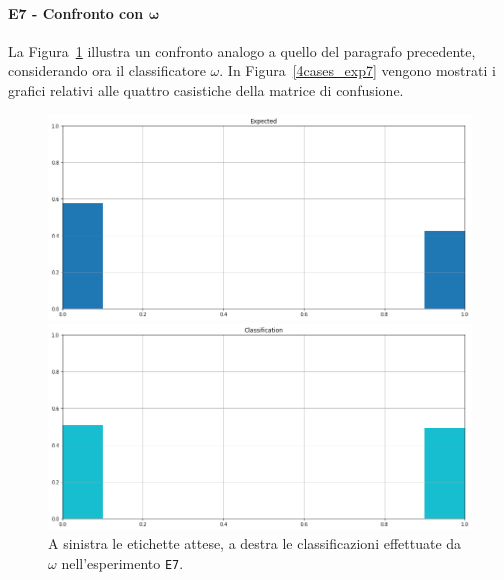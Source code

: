 \documentclass[12pt]{report}
\theoremstyle{definition}
\begin{document}
\paragraph{E7 - Confronto con $\bm{\omega}$}
La Figura~\ref{classification_exp7} illustra un confronto analogo a quello del paragrafo precedente, considerando ora il classificatore $\omega$.
In Figura~\ref{4cases_exp7} vengono mostrati i grafici relativi alle quattro casistiche della matrice di confusione.
\begin{figure}
\centering
    \begin{minipage}{0.48\textwidth}
        \includegraphics[width=\linewidth]{images/experiment_kaggle/expected_classification.png}
    \end{minipage}
    \begin{minipage}{0.48\textwidth}
        \includegraphics[width=\linewidth]{images/experiment_kaggle/prediction_classification.png}
    \end{minipage}
    \caption{A sinistra le etichette attese, a destra le classificazioni effettuate da $\omega$ nell'esperimento \texttt{E7}.}
    \label{classification_exp7}
\end{figure}
\end{document}
